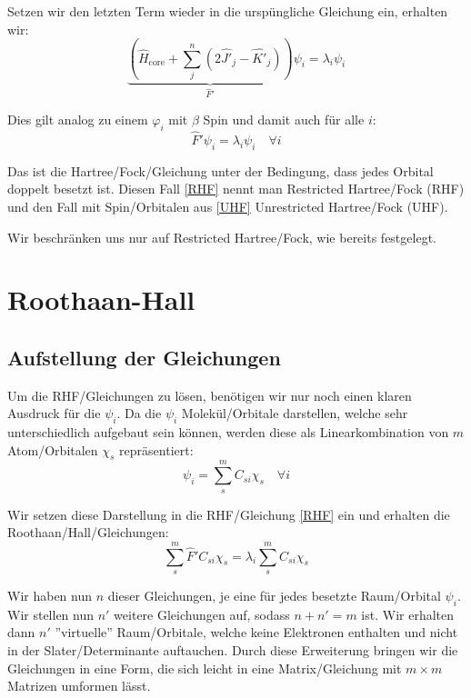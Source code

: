 Setzen wir den letzten Term wieder in die urspüngliche Gleichung ein, erhalten wir:
\begin{equation}
  \underbrace{\left( \hat{H}_{\text{core}} + \sum_j^{n}
  \left( 2\hat{J'}_j - \hat{K'}_j \right) \right)}_{\hat{F}'} \psi_i 
  = \lambda_i \psi_i
\end{equation}

Dies gilt analog zu einem $\varphi_i$ mit $\beta$ Spin und damit auch für alle $i$:
\begin{equation}\label{RHF}
  \hat{F}' \psi_i = \lambda_i \psi_i\quad \forall i
\end{equation}

Das ist die Hartree\-/Fock\-/Gleichung unter der Bedingung, dass jedes Orbital doppelt besetzt ist.
Diesen Fall \cref{RHF} nennt man Restricted Hartree\-/Fock (RHF) und
den Fall mit Spin\-/Orbitalen aus \cref{UHF} Unrestricted Hartree\-/Fock (UHF).

Wir beschränken uns nur auf Restricted Hartree\-/Fock, wie bereits festgelegt.

\cite[Ab. 3.4.1]{szabo_ostlund_1996}
\cite[Aufgabe 1]{tc2_spin}

\section{Roothaan-Hall}
\subsection{Aufstellung der Gleichungen}
Um die RHF\-/Gleichungen zu lösen, benötigen wir nur noch einen klaren Ausdruck für die $\psi_i$.
Da die $\psi_i$ Molekül\-/Orbitale darstellen, welche sehr unterschiedlich aufgebaut sein können,
werden diese als Linearkombination von $m$ Atom\-/Orbitalen $\chi_s$ repräsentiert:
\begin{equation}\label{lin-comb-atomorbitals}
  \psi_i = \sum_s^m C_{s i} \chi_s \quad \forall i 
\end{equation}

Wir setzen diese Darstellung in die RHF\-/Gleichung \cref{RHF} ein und
erhalten die Roothaan\-/Hall\-/Gleichungen:
\begin{equation}\label{roothaan_hall_eq}
  \sum_s^m \hat{F}' C_{s i} \chi_s = \lambda_i \sum_s^m C_{s i} \chi_s 
\end{equation}

Wir haben nun $n$ dieser Gleichungen, je eine für jedes besetzte Raum\-/Orbital $\psi_i$.
Wir stellen nun $n'$ weitere Gleichungen auf, sodass $n + n' = m$ ist.
Wir erhalten dann $n'$ ''virtuelle'' Raum\-/Orbitale, welche keine Elektronen enthalten und
nicht in der Slater\-/Determinante auftauchen.
Durch diese Erweiterung bringen wir die Gleichungen in eine Form,
die sich leicht in eine Matrix\-/Gleichung mit $m\times m$ Matrizen umformen lässt.

